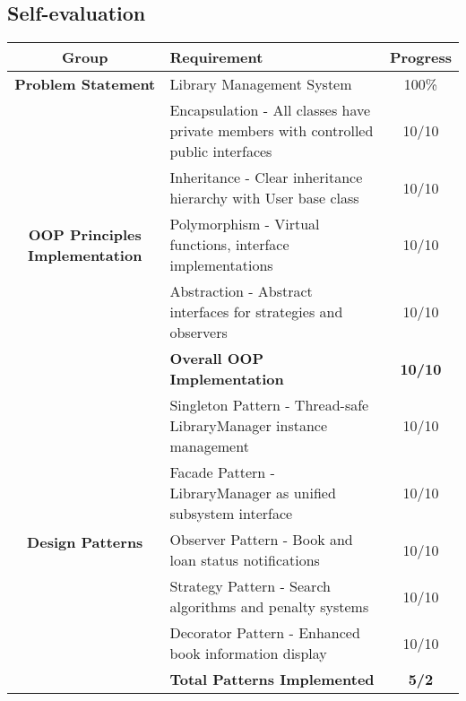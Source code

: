 \subsection*{Self-evaluation}
\begin{center}
    \begin{table}[H]
        \renewcommand{\arraystretch}{1.5}
        \setlength{\tabcolsep}{8pt}
        
        \begin{tabularx}{\textwidth}{| c | X | c |}
            \hline
            \rowcolor{gray!30}
            \textbf{Group} & \textbf{Requirement} & \textbf{Progress} \\
            \hline

            \textbf{Problem Statement}
            & Library Management System & 100\% \\
            \hline
            
            \multirow{5}{*}{\parbox{4cm}{\centering\textbf{OOP Principles Implementation}}}
            & Encapsulation - All classes have private members with controlled public interfaces & 10/10 \\
            \cline{2-3}
             & Inheritance - Clear inheritance hierarchy with User base class & 10/10 \\
            \cline{2-3}
             & Polymorphism - Virtual functions, interface implementations & 10/10 \\
            \cline{2-3}
             & Abstraction - Abstract interfaces for strategies and observers & 10/10 \\
            \cline{2-3}
             & \textbf{Overall OOP Implementation} & \textbf{10/10} \\
            \hline

            \multirow{7}{*}{\parbox{4cm}{\centering\textbf{Design Patterns}}}
            & Singleton Pattern - Thread-safe LibraryManager instance management & 10/10 \\
            \cline{2-3}
             & Facade Pattern - LibraryManager as unified subsystem interface & 10/10 \\
            \cline{2-3}
             & Observer Pattern - Book and loan status notifications & 10/10 \\
            \cline{2-3}
             & Strategy Pattern - Search algorithms and penalty systems & 10/10 \\
            \cline{2-3}
             & Decorator Pattern - Enhanced book information display & 10/10 \\
            \cline{2-3}
             & \textbf{Total Patterns Implemented} & \textbf{5/2} \\
            \hline


\end{tabularx}
\end{table}
\end{center}
